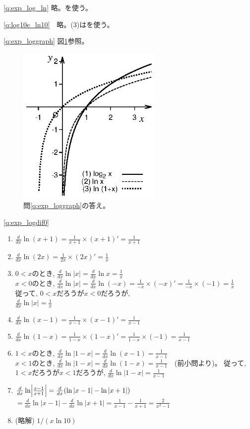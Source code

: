 \ref{q:exp_log_ln} 略。を使う。
\mv

\ref{q:log10e_ln10}　略。(3)はを使う。
\mv


\ref{q:exp_loggraph}  図\ref{fig:log_ln_ln1x_graph}参照。

\begin{figure}[h]
    \centering
      \includegraphics[width=7cm]{log2_ln.eps}
      \caption{問\ref{q:exp_loggraph}の答え。\label{fig:log_ln_ln1x_graph}}
\end{figure}

\ref{q:exp_logdif0} 
\begin{enumerate}
\item $\frac{d}{dx}\ln(x+1)=\frac{1}{x+1}\times(x+1)'=\frac{1}{x+1}$
\item $\frac{d}{dx}\ln(2x)=\frac{1}{2x}\times(2x)'=\frac{1}{x}$
\item $0<x$のとき, $\frac{d}{dx}\ln|x|=\frac{d}{dx}\ln x = \frac{1}{x}$\\
$x<0$のとき, $\frac{d}{dx}\ln|x|=\frac{d}{dx}\ln(-x) = \frac{1}{-x}\times(-x)'=\frac{1}{-x}\times(-1)=\frac{1}{x}$\\
従って, $0<x$だろうが$x<0$だろうが, \\$\frac{d}{dx}\ln|x|=\frac{1}{x}$
\item $\frac{d}{dx}\ln(x-1)=\frac{1}{x-1}\times(x-1)'=\frac{1}{x-1}$
\item $\frac{d}{dx}\ln(1-x)=\frac{1}{1-x}\times(1-x)'=\frac{1}{1-x}\times(-1)=\frac{1}{x-1}$
\item $1<x$のとき, $\frac{d}{dx}\ln|1-x|=\frac{d}{dx}\ln (x-1) = \frac{1}{x-1}$ \\
$x<1$のとき, $\frac{d}{dx}\ln|1-x|=\frac{d}{dx}\ln(1-x) = \frac{1}{x-1}$　(前小問より)。
従って, $1<x$だろうが$x<1$だろうが, $\frac{d}{dx}\ln|1-x|=\frac{1}{x-1}$
\item $\frac{d}{dx}\ln \Bigl|\frac{x-1}{x+1}\Bigr|=\frac{d}{dx}(\ln |x-1|-\ln |x+1|)$\\
$=\frac{d}{dx}\ln |x-1|-\frac{d}{dx}\ln |x+1| = \frac{1}{x-1} - \frac{1}{x+1}=\frac{2}{x^2-1}$
\item (略解) $1/(x\ln 10)$
\end{enumerate}

